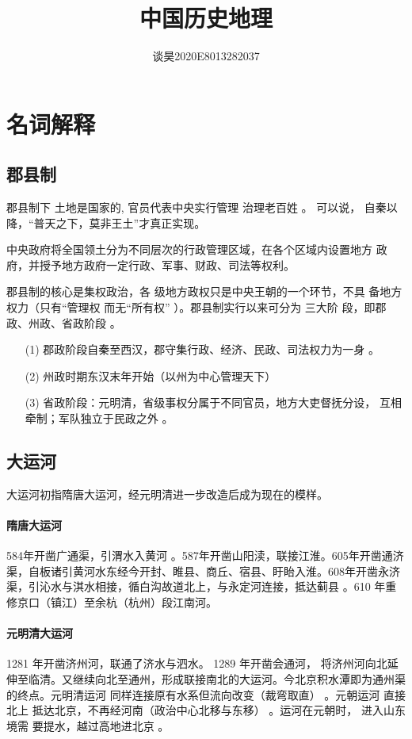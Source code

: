 \documentclass[UTF8,a4paper]{ctexart}
\title{\bfseries 中国历史地理 }
\author{谈昊\quad2020E8013282037}
\date{}
\begin{document}
\maketitle




\section{名词解释}
\subsection{郡县制}
郡县制下
土地是国家的, 官员代表中央实行管理 治理老百姓 。 可以说，
自秦以降，“普天之下，莫非王土”才真正实现。\par
中央政府将全国领土分为不同层次的行政管理区域，在各个区域内设置地方
政府，并授予地方政府一定行政、军事、财政、司法等权利。\par
郡县制的核心是集权政治，各 级地方政权只是中央王朝的一个环节，不具
备地方权力（只有“管理权 而无“所有权” ）。郡县制实行以来可分为 三大阶
段，即郡政、州政、省政阶段 。
\begin{itemize}
    \item [(1)] 郡政阶段自秦至西汉，郡守集行政、经济、民政、司法权力为一身 。
    \item [(2)] 州政时期东汉末年开始（以州为中心管理天下）
    \item [(3)] 省政阶段：元明清，省级事权分属于不同官员，地方大吏督抚分设，
    互相牵制；军队独立于民政之外 。
\end{itemize}

\subsection{大运河}
大运河初指隋唐大运河，经元明清进一步改造后成为现在的模样。
\paragraph{隋唐大运河}
584年开凿广通渠，引渭水入黄河 。587年开凿山阳渎，联接江淮。605年开凿通济渠，自板诸引黄河水东经今开封、睢县、商丘、宿县、盱眙入淮。608年开凿永济渠，引沁水与淇水相接，循白沟故道北上，与永定河连接，抵达蓟县 。610
年重修京口（镇江）至余杭（杭州）段江南河。
\paragraph{元明清大运河}
1281 年开凿济州河，联通了济水与泗水。 1289 年开凿会通河，
将济州河向北延伸至临清。又继续向北至通州，形成联接南北的大运河。今北京积水潭即为通州渠的终点。元明清运河
同样连接原有水系但流向改变（裁弯取直） 。元朝运河 直接北上
抵达北京，不再经河南（政治中心北移与东移） 。运河在元朝时， 进入山东境需
要提水，越过高地进北京 。
\end{document}

